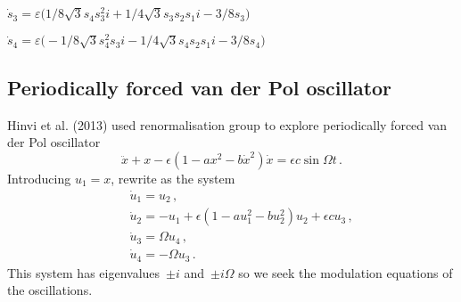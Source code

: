 \documentclass[11pt,a5paper]{article}
\begin{document}
\begin{math}
\dot s_{3}=\varepsilon  \big(1/8 \sqrt {3} s_{4} s_{3}^{2} i+1/4 \sqrt {
3} s_{3} s_{2} s_{1} i-3/8 s_{3}\big)
\end{math}\par

\begin{math}
\dot s_{4}=\varepsilon  \big(-1/8 \sqrt {3} s_{4}^{2} s_{3} i-1/4 
\sqrt {3} s_{4} s_{2} s_{1} i-3/8 s_{4}\big)
\end{math}\par





%
%







\subsection{Periodically forced van der Pol oscillator}

Hinvi et al. (2013) used renormalisation group to explore periodically forced van der Pol oscillator
\begin{equation*}
\ddot x+x-\epsilon(1-ax^2-b\dot x^2)\dot x=\epsilon c\sin \Omega t\,.
\end{equation*}
Introducing \(u_1=x\), rewrite as the system
\begin{eqnarray*}
&&\dot u_1=u_2\,,
\\&&\dot u_2=-u_1+\epsilon(1-au_1^2-bu_2^2)u_2+\epsilon cu_3\,,
\\&&\dot u_3=\Omega u_4\,,
\\&&\dot u_4=-\Omega u_3\,.
\end{eqnarray*}
This system has eigenvalues~\(\pm i\) and~\(\pm i\Omega\) so we seek the modulation equations of the oscillations.
\end{document}
